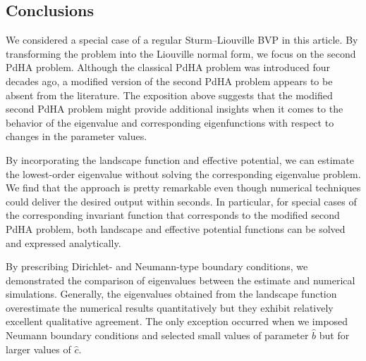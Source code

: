 \documentclass[symmetry,article,accept,moreauthors,pdftex,a4paper]{mdpi}
\begin{document}
\begin{paracol}{2}
\switchcolumn

\section{Conclusions}	\label{conclude}

We  considered a special case of a regular Sturm--Liouville BVP in this article. By transforming the problem into the Liouville normal form, we focus on the second PdHA problem. Although the classical PdHA problem {was} introduced four decades ago, a modified version of the second PdHA problem appears to be absent from the literature. The exposition above suggests that the modified second PdHA problem might provide additional insights when it comes to the behavior of the eigenvalue and corresponding eigenfunctions with respect to changes in the parameter values.

By incorporating the landscape function and effective potential, we can estimate the lowest-order eigenvalue without solving the corresponding eigenvalue problem.  We find that the approach is pretty remarkable even though numerical techniques could deliver the desired output within seconds. In particular, for special cases of the corresponding invariant function that corresponds to the modified second PdHA problem, both landscape and effective potential functions can be solved and expressed analytically. 

By prescribing Dirichlet- and Neumann-type boundary conditions, we  demonstrated the comparison of eigenvalues between the estimate and numerical simulations. Generally, the eigenvalues obtained from the landscape function overestimate the numerical results quantitatively but they exhibit relatively excellent qualitative agreement. The only exception occurred when we imposed Neumann boundary conditions and selected small values of parameter $\widehat{b}$ but for larger values of $\widehat{c}$.

\vspace{16pt}








\end{paracol}
\end{document}
